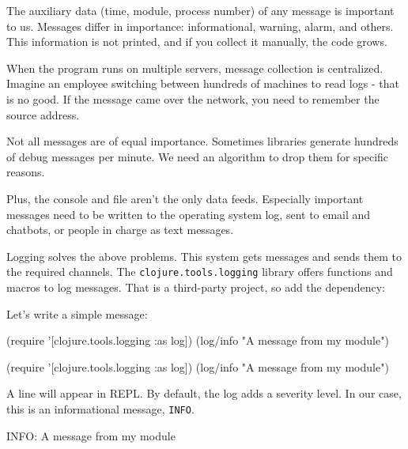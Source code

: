 The auxiliary data (time, module, process number) of any message is important to us. Messages differ in importance: informational, warning, alarm, and others. This information is not printed, and if you collect it manually, the code grows.

When the program runs on multiple servers, message collection is centralized. Imagine an employee switching between hundreds of machines to read logs - that is no good. If the message came over the network, you need to remember the source address.

Not all messages are of equal importance. Sometimes libraries generate hundreds of debug messages per minute. We need an algorithm to drop them for specific reasons.

Plus, the console and file aren't the only data feeds. Especially important messages need to be written to the operating system log, sent to email and chatbots, or people in charge as text messages.

Logging solves the above problems. This system gets messages and sends them to the required channels. The \verb|clojure.tools.logging| library offers functions and macros to log messages. That is a third-party project, so add the dependency:


\begin{clojure}
\end{clojure}

\noindent
Let's write a simple message:

\ifx\DEVICETYPE\MOBILE

\begin{clojure}
(require
  '[clojure.tools.logging :as log])
(log/info "A message from my module")
\end{clojure}

\else

\begin{clojure}
(require '[clojure.tools.logging :as log])
(log/info "A message from my module")
\end{clojure}

\fi

\noindent
A line will appear in REPL. By default, the log adds a severity level. In our case, this is an informational message, \verb|INFO|.

\begin{text}
INFO: A message from my module
\end{text}

